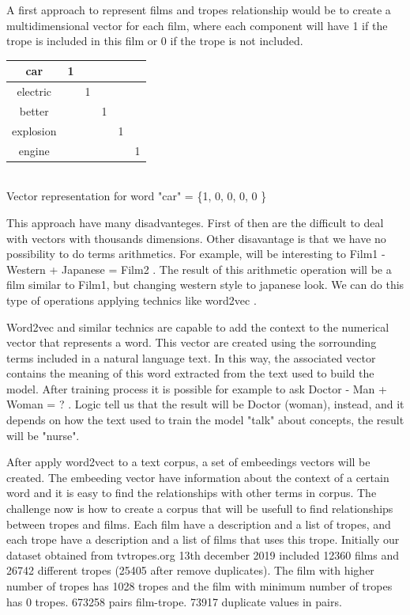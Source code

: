 \documentclass[letterpaper]{article}
\begin{document}
A first approach to represent films and tropes relationship would be to create a multidimensional vector for each film, where each component will have 1 if the trope is included in this film or 0 if the trope is not included. 
\begin{center}
	
\begin{tabular}{|c|c|c|c|c|c|} 
	\hline car 
	& 1 &  &  &  & \\ 
	\hline electric
	&  & 1 &  &  & \\ 
	\hline better
	&  &  & 1 &  & \\ 
	\hline explosion
	&  &  &  & 1 & \\ 
	\hline engine
	&  &  &  &  & 1 \\ 
	\hline 
\end{tabular} 
   \\ Vector representation for word "car" = \{1, 0, 0, 0, 0 \}    
\end{center}

This approach have many disadvanteges. First of then are the difficult to deal with vectors with thousands dimensions. Other disavantage is that we have no possibility to do terms arithmetics. For example, will be interesting to Film1 - Western + Japanese = Film2 . The result of this arithmetic operation will be a film similar to Film1, but changing western style to japanese look. We can do this type of operations applying technics like word2vec \cite{mikolov2013}.  

Word2vec and similar technics are capable to add the context to the
numerical vector that represents a word. This vector are created using
the sorrounding terms included in a natural language text. In this
way, the associated vector contains the meaning of this word extracted
from the text used to build the model. After training process it is
possible for example to ask Doctor - Man + Woman = ? . Logic tell us
that the result will be Doctor (woman), instead, and it depends on how
the text used to train the model "talk" about concepts, the result
will be "nurse".  %
   
After apply word2vect to a text corpus, a set of embeedings vectors will be created. The embeeding vector have information about the context of a certain word and it is easy to find the relationships with other terms in corpus. The challenge now is how to create a corpus that will be usefull to find relationships between tropes and films. Each film have a description and a list of tropes, and each trope have a description and a list of films that uses this trope. Initially our dataset obtained from tvtropes.org 13th december 2019 included 12360 films and 26742 different tropes (25405 after remove duplicates). The film with higher number of tropes has 1028 tropes and the film with minimum number of tropes has 0 tropes. 673258 pairs film-trope. 73917 duplicate values in pairs. 
\end{document}
